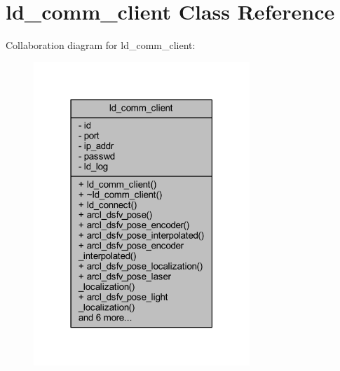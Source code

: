 \hypertarget{classld__comm__client}{}\section{ld\+\_\+comm\+\_\+client Class Reference}
\label{classld__comm__client}


Collaboration diagram for ld\+\_\+comm\+\_\+client\+:\nopagebreak
\begin{figure}[H]
\begin{center}
\leavevmode
\includegraphics[width=231pt]{classld__comm__client__coll__graph}
\end{center}
\end{figure}
